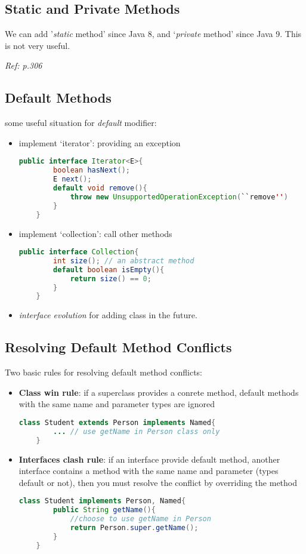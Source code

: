 \documentclass[12pt]{article}
\begin{document}
\subsection{Static and Private Methods}
We can add '\emph{static} method' since Java 8, and `\emph{private} method' since Java 9.
This is not very useful.

\textit{Ref: p.306}

\subsection{Default Methods}
some useful situation for \emph{default} modifier:
\begin{itemize}
    \item implement `iterator': providing an exception
    \begin{lstlisting}[language=Java]
    public interface Iterator<E>{
        boolean hasNext();
        E next();
        default void remove(){
            throw new UnsupportedOperationException(``remove'')
        }
    }
    \end{lstlisting}
    \item implement `collection': call other methods
    \begin{lstlisting}[language=Java]
    public interface Collection{
        int size(); // an abstract method
        default boolean isEmpty(){
            return size() == 0;
        }
    }
    \end{lstlisting}
    \item \emph{interface evolution} for adding class in the future.
\end{itemize} 

\subsection{Resolving Default Method Conflicts}
Two basic rules for resolving default method conflicts:
\begin{itemize}
    \item \textbf{Class win rule}: if a superclass provides a conrete method, 
    default methods with the same name and parameter types are ignored
    \begin{lstlisting}[language=Java]
    class Student extends Person implements Named{
        ... // use getName in Person class only
    }
    \end{lstlisting}

    \item \textbf{Interfaces clash rule}: if an interface provide default method, 
    another interface contains a method with the same name and parameter (types default or not),
    then you must resolve the conflict by overriding the method 
    \begin{lstlisting}[language=Java]
    class Student implements Person, Named{
        public String getName(){
            //choose to use getName in Person
            return Person.super.getName();
        }
    }
    \end{lstlisting}
\end{itemize}
\end{document}
